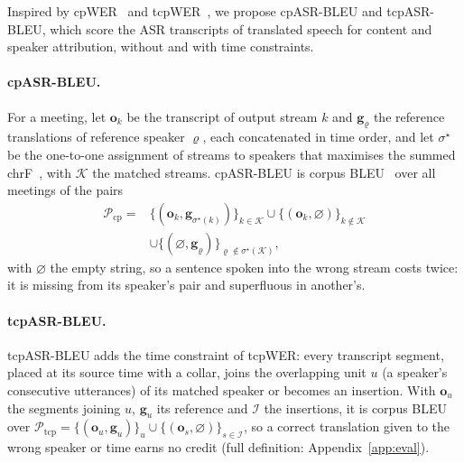 Inspired by cpWER~\citep{watanabe2020chime6} and tcpWER~\citep{neumann2023meeteval}, we propose cpASR-BLEU and tcpASR-BLEU,
which score the ASR transcripts of translated speech for content and speaker attribution, without and with time
constraints.

\paragraph{cpASR-BLEU.} For a meeting, let $\bm{o}_k$ be the transcript of output stream $k$ and $\bm{g}_\varrho$ the
reference translations of reference speaker $\varrho$, each concatenated in time order, and let $\sigma^\star$ be the
one-to-one assignment of streams to speakers that maximises the summed chrF~\citep{popovic2015chrf}, with $\mathcal{K}$
the matched streams. cpASR-BLEU is corpus BLEU~\citep{post2018call} over all meetings of the pairs
\begin{equation}
\begin{aligned}
\mathcal{P}_{\mathrm{cp}}={}&\{(\bm{o}_k,\bm{g}_{\sigma^\star(k)})\}_{k\in\mathcal{K}}\cup\{(\bm{o}_k,\varnothing)\}_{k\notin\mathcal{K}}\\
&\cup\{(\varnothing,\bm{g}_\varrho)\}_{\varrho\notin\sigma^\star(\mathcal{K})},
\end{aligned}
\label{eq:cpbleu}
\end{equation}
with $\varnothing$ the empty string, so a sentence spoken into the wrong stream costs twice: it is missing from its
speaker's pair and superfluous in another's.

\paragraph{tcpASR-BLEU.} tcpASR-BLEU adds the time constraint of tcpWER: every transcript segment, placed at its source
time with a collar, joins the overlapping unit $u$ (a speaker's consecutive utterances) of its matched speaker or
becomes an insertion. With $\bm{o}_u$ the segments joining $u$, $\bm{g}_u$ its reference and $\mathcal{I}$ the
insertions, it is corpus BLEU over $\mathcal{P}_{\mathrm{tcp}}=\{(\bm{o}_u,\bm{g}_u)\}_u\cup\{(\bm{o}_s,\varnothing)\}_{s\in\mathcal{I}}$,
so a correct translation given to the wrong speaker or time earns no credit (full definition: Appendix~\ref{app:eval}).
